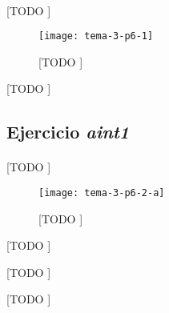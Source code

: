 \documentclass[spanish]{article}
\begin{document}
			\paragraph{}
			[TODO ]


			\begin{figure}[h]
				\begin{center}
					\texttt{[image: tema-3-p6-1]}
				\end{center}
				\caption{[TODO ]}
				\label{}
			\end{figure}


			\begin{table}[h]
				\begin{center}
				\end{center}
				\caption{[TODO ]}
				\label{}
			\end{table}

		\subsection{Ejercicio \emph{aint1}}
		\label{sec:e-6.2a}

			\paragraph{}
			[TODO ]


			\begin{figure}[h]
				\begin{center}
					\texttt{[image: tema-3-p6-2-a]}
				\end{center}
				\caption{[TODO ]}
				\label{}
			\end{figure}

			\begin{table}[h]
				\begin{center}
				\end{center}
				\caption{[TODO ]}
				\label{}
			\end{table}

			\begin{table}[h]
				\begin{center}
				\end{center}
				\caption{[TODO ]}
				\label{}
			\end{table}

			\begin{table}[h]
				\begin{center}
				\end{center}
				\caption{[TODO ]}
				\label{}
			\end{table}
\end{document}
